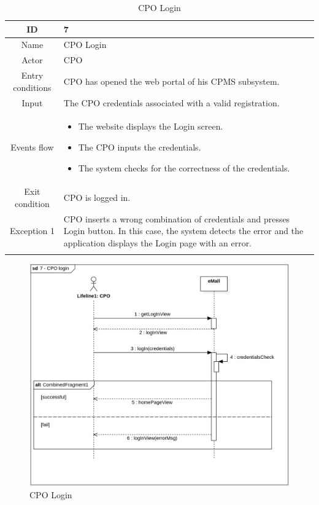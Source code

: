\begin{longtable}{|c| p{10cm}|}
    \hline ID        & 7\\
    \hline
    Name     & CPO Login \\
    \hline
    Actor            & CPO\\
    \hline 
    Entry conditions & CPO has opened the web portal of his CPMS subsystem.
        \\
    \hline
    Input & The CPO credentials associated with a valid registration.
    \\
    \hline
    Events flow      & \begin{itemize}[nosep,after=\strut]
        \item The website displays the Login screen.
        \item The CPO inputs the credentials.
        \item The system checks for the correctness of the credentials.
        \end{itemize} \\
    \hline
    Exit condition   & CPO is logged in.
    \\
    \hline
    Exception 1      & CPO inserts a wrong combination of credentials and presses Login button. In this case, the system detects the error and the application displays the Login page with an error. \\
    \hline
    \caption{CPO Login}\\
\end{longtable}
\begin{figure}[H]
    \begin{center}
        \includegraphics[width=\textwidth]{img/sequence/login-cpo.png}
        \caption{CPO Login}
    \end{center}
\end{figure}

